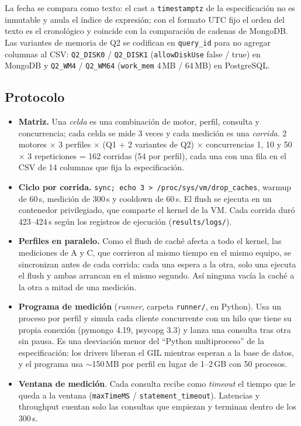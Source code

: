 \documentclass[11pt,letterpaper]{article}
\begin{document}
\noindent La fecha se compara como texto: el cast a \texttt{timestamptz} de la especificación no es
inmutable y anula el índice de expresión; con el formato UTC fijo el orden del texto es el
cronológico y coincide con la comparación de cadenas de MongoDB. Las variantes de memoria de Q2 se
codifican en \texttt{query\_id} para no agregar columnas al CSV: \texttt{Q2\_DISK0} /
\texttt{Q2\_DISK1} (\texttt{allowDiskUse} false / true) en MongoDB y \texttt{Q2\_WM4} /
\texttt{Q2\_WM64} (\texttt{work\_mem} 4\,MB / 64\,MB) en PostgreSQL.

\subsection{Protocolo}
\begin{itemize}
  \item \textbf{Matriz.} Una \emph{celda} es una combinación de motor, perfil, consulta y
        concurrencia; cada celda se mide 3 veces y cada medición es una \emph{corrida}.
        2 motores $\times$ 3 perfiles $\times$ (Q1 + 2 variantes de Q2) $\times$ concurrencias
        1, 10 y 50 $\times$ 3 repeticiones = 162 corridas (54 por perfil), cada una con una fila
        en el CSV de 14 columnas que fija la especificación.
  \item \textbf{Ciclo por corrida.} \texttt{sync; echo 3 > /proc/sys/vm/drop\_caches}, warmup de
        60\,s, medición de 300\,s y cooldown de 60\,s. El flush se ejecuta en un contenedor
        privilegiado, que comparte el kernel de la VM. Cada corrida duró 423--424\,s
        según los registros de ejecución (\texttt{results/logs/}).
  \item \textbf{Perfiles en paralelo.} Como el flush de caché afecta a todo el kernel, las
        mediciones de A y C, que corrieron al mismo tiempo en el mismo equipo, se sincronizan
        antes de cada corrida: cada una espera a la otra, solo una ejecuta el flush y ambas
        arrancan en el mismo segundo. Así ninguna vacía la caché a la otra a mitad de una
        medición.
  \item \textbf{Programa de medición} (\emph{runner}, carpeta \texttt{runner/}, en Python).
        Usa un proceso por perfil y simula cada cliente concurrente con un hilo que tiene su
        propia conexión (pymongo 4.19, psycopg 3.3) y lanza una consulta tras otra sin pausa. Es
        una desviación menor del ``Python multiproceso'' de la especificación: los drivers
        liberan el GIL mientras esperan a la base de datos, y el programa usa $\sim$150\,MB por
        perfil en lugar de 1--2\,GB con 50 procesos.
  \item \textbf{Ventana de medición}. Cada consulta recibe como \emph{timeout} el tiempo
        que le queda a la ventana (\texttt{maxTimeMS} / \texttt{statement\_timeout}). Latencias y
        throughput cuentan solo las consultas que empiezan y terminan dentro de los 300\,s.
\end{itemize}
\end{document}
